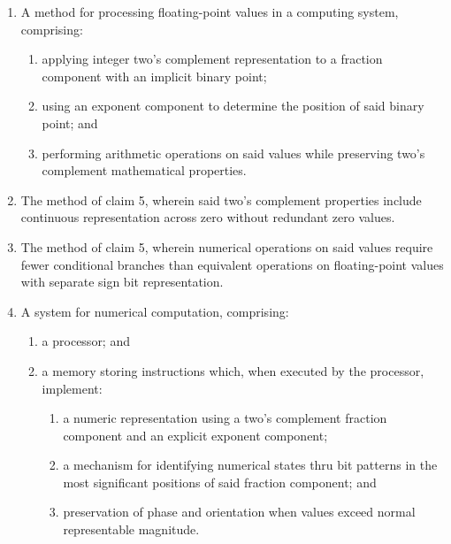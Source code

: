 \documentclass[12pt,letter]{article}
\begin{document}
\begin{enumerate}
    \item A method for processing floating-point values in a computing system, comprising:
        \begin{enumerate}
            \item applying integer two's complement representation to a fraction component with an implicit binary point;
            \item using an exponent component to determine the position of said binary point; and
            \item performing arithmetic operations on said values while preserving two's complement mathematical properties.
        \end{enumerate}
    
    \item The method of claim 5, wherein said two's complement properties include continuous representation across zero without redundant zero values.
    
    \item The method of claim 5, wherein numerical operations on said values require fewer conditional branches than equivalent operations on floating-point values with separate sign bit representation.
    
    \item A system for numerical computation, comprising:
        \begin{enumerate}
            \item a processor; and
            \item a memory storing instructions which, when executed by the processor, implement:
                \begin{enumerate}
                    \item a numeric representation using a two's complement fraction component and an explicit exponent component;
                    \item a mechanism for identifying numerical states thru bit patterns in the most significant positions of said fraction component; and
                    \item preservation of phase and orientation when values exceed normal representable magnitude.
                \end{enumerate}
        \end{enumerate}
    

\end{enumerate}
\end{document}
